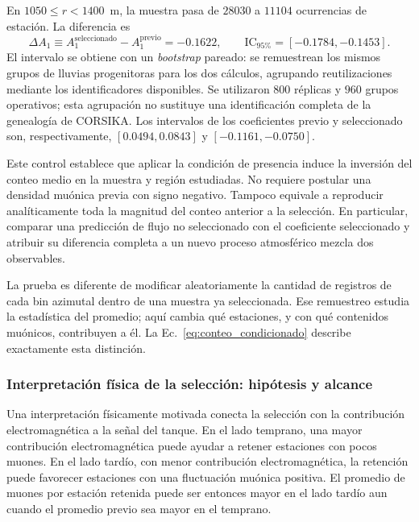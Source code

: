 En $1050\leq r<1400$~m, la muestra pasa de $28030$ a $11104$ ocurrencias de estación. La diferencia es
\begin{equation}
\Delta A_1\equiv A_1^{\mathrm{seleccionado}}-A_1^{\mathrm{previo}}
=-0.1622,
\qquad \mathrm{IC}_{95\%}=[-0.1784,-0.1453].
\label{eq:resultado_seleccion_sd}
\end{equation}
El intervalo se obtiene con un \textit{bootstrap} pareado: se remuestrean los mismos grupos de lluvias progenitoras para los dos cálculos, agrupando reutilizaciones mediante los identificadores disponibles. Se utilizaron $800$ réplicas y $960$ grupos operativos; esta agrupación no sustituye una identificación completa de la genealogía de CORSIKA. Los intervalos de los coeficientes previo y seleccionado son, respectivamente, $[0.0494,0.0843]$ y $[-0.1161,-0.0750]$.

Este control establece que aplicar la condición de presencia induce la inversión del conteo medio en la muestra y región estudiadas. No requiere postular una densidad muónica previa con signo negativo. Tampoco equivale a reproducir analíticamente toda la magnitud del conteo anterior a la selección. En particular, comparar una predicción de flujo no seleccionado con el coeficiente seleccionado y atribuir su diferencia completa a un nuevo proceso atmosférico mezcla dos observables.

La prueba es diferente de modificar aleatoriamente la cantidad de registros de cada bin azimutal dentro de una muestra ya seleccionada. Ese remuestreo estudia la estadística del promedio; aquí cambia qué estaciones, y con qué contenidos muónicos, contribuyen a él. La Ec.~\ref{eq:conteo_condicionado} describe exactamente esta distinción.

\subsubsection{Interpretación física de la selección: hipótesis y alcance}

Una interpretación físicamente motivada conecta la selección con la contribución electromagnética a la señal del tanque. En el lado temprano, una mayor contribución electromagnética puede ayudar a retener estaciones con pocos muones. En el lado tardío, con menor contribución electromagnética, la retención puede favorecer estaciones con una fluctuación muónica positiva. El promedio de muones por estación retenida puede ser entonces mayor en el lado tardío aun cuando el promedio previo sea mayor en el temprano.

